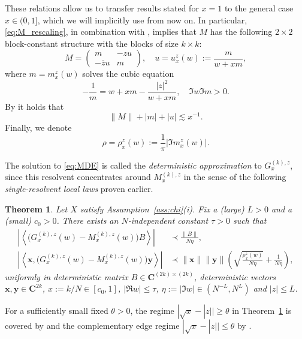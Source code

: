 \documentclass[10pt]{amsart}
\newtheorem{theorem}{Theorem}[section]
\numberwithin{equation}{section}
\newcommand{\C}{\mathbf{C}}
\begin{document}
These relations allow us to transfer results stated for $x=1$ to the general case $x\in(0,1]$, which we will implicitly use from now on. In particular, \eqref{eq:M_rescaling}, in combination with \cite[Eq.(3.5)-(3.6)]{loc_circ_law18}, implies that $M$ has the following $2\times 2$ block-constant structure with the blocks of size $k\times k$:
\begin{equation}
M=\begin{pmatrix}
m&-zu\\ -\overline{z}u&m
\end{pmatrix},\quad u=u^{z}_x(w):=\frac{m}{w+xm},
\label{eq:def_u}
\end{equation}
where $m=m^{z}_x(w)$ solves the cubic equation
\begin{equation}
-\frac{1}{m} = w+xm -\frac{|z|^2}{w+xm},\quad \Im w\Im m>0.
\label{eq:m_cubic}
\end{equation}
By \cite[Eq.(3.3)]{macroCLT_complex} it holds that
\begin{equation}
\|M\|+|m|+|u|\lesssim x^{-1}.
\label{eq:Mmu_bound}
\end{equation}
Finally, we denote
\begin{equation}
\rho=\rho^z_x(w):=\frac{1}{\pi}|\Im m^z_x(w)|.
\label{eq:def_rho}
\end{equation}


The solution to \eqref{eq:MDE} is called the \emph{deterministic approximation} to $G^{(k),z}_x$, since this resolvent concentrates around $M^{(k),z}_x$ in the sense of the following \emph{single-resolvent local laws} proven earlier.
\begin{theorem} \label{theo:1Gllaw}
Let $X$ satisfy Assumption~\ref{ass:chi}(i). Fix a (large) $L>0$ and a (small) $c_0>0$. There exists an $N$-independent constant $\tau>0$ such that
\begin{align}
\left\vert\left\langle \big(G^{(k),z}_x(w)-M^{(k),z}_x(w)\big)B\right\rangle\right\vert &\prec\frac{\|B\|}{N\eta},\label{eq:1G_av}\\
\left\vert\left\langle \bm{x}, \big(G^{(k),z}_x(w)-M^{(k),z}_x(w)\big)\bm{y}\right\rangle\right\vert &\prec\|\bm{x}\|\|\bm{y}\|\left(\sqrt{\frac{\rho_x^{z}(w)}{N\eta}}+\frac{1}{N\eta}\right),\label{eq:1G_iso}
\end{align}
uniformly in deterministic matrix $B\in\C^{(2k)\times (2k)}$, deterministic vectors $\bm{x},\bm{y}\in\C^{2k}$, $x:=k/N\in [c_0,1]$, $|\Re w|\le \tau$, $\eta:=|\Im w|\in (N^{-L}, N^L)$ and $|z|\le L$.
\end{theorem}
For a sufficiently small fixed $\theta>0$, the regime $|\sqrt{x}-|z||\ge \theta$ in Theorem~\ref{theo:1Gllaw} is covered by \cite[Theorem~3.1]{macroCLT_real} and the complementary edge regime $|\sqrt{x}-|z||\le \theta$ by \cite[Theorem~3.1]{spectral_radius}.
\end{document}
